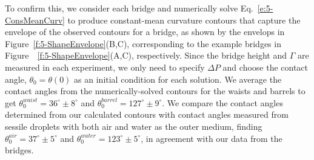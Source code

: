 To confirm this, we consider each bridge and numerically solve Eq.~\ref{e:5-ConsMeanCurv} to produce constant-mean curvature contours that capture the envelope of the observed contours for a bridge, as shown by the envelops in Figure~\ref{f:5-ShapeEnvelope}(B,C), corresponding to the example bridges in Figure~~\ref{f:5-ShapeEnvelope}(A,C), respectively.
Since the bridge height and $\Gamma$ are measured in each experiment, we only need to specify $\Delta P$ and choose the contact angle, $\theta_0 = \theta(0)$ as an initial condition for each solution.
We average the contact angles from the numerically-solved contours for the waists and barrels to get $\theta^{waist}_0 = 36^{\circ} \pm 8^{\circ}$ and $\theta^{barrel}_0 = 127^{\circ} \pm 9^{\circ}$.
We compare the contact angles determined from our calculated contours with contact angles measured from sessile droplets with both air and water as the outer medium, finding $\theta_0^{air} = 37^{\circ} \pm 5^{\circ}$ and $\theta_0^{water} = 123^{\circ} \pm 5^{\circ}$, in agreement with our data from the bridges.




